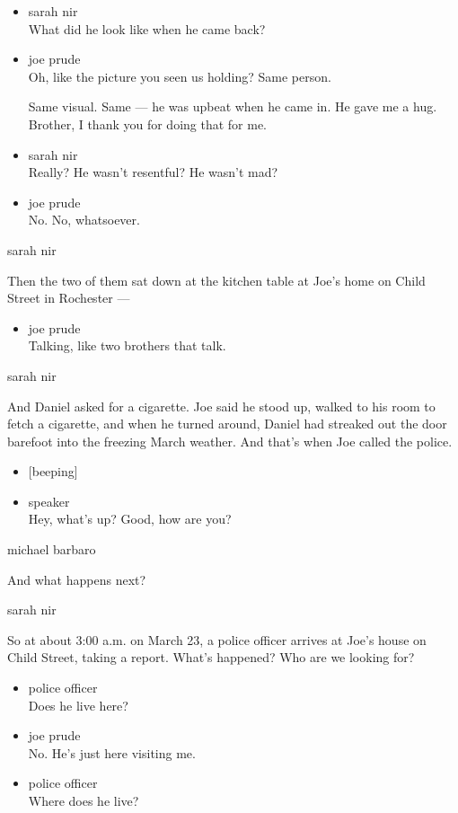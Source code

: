 \begin{itemize}
\item
  sarah nir\\
  What did he look like when he came back?
\item
  joe prude\\
  Oh, like the picture you seen us holding? Same person.

  Same visual. Same --- he was upbeat when he came in. He gave me a hug.
  Brother, I thank you for doing that for me.
\item
  sarah nir\\
  Really? He wasn't resentful? He wasn't mad?
\item
  joe prude\\
  No. No, whatsoever.
\end{itemize}

sarah nir

Then the two of them sat down at the kitchen table at Joe's home on
Child Street in Rochester ---

\begin{itemize}
\tightlist
\item
  joe prude\\
  Talking, like two brothers that talk.
\end{itemize}

sarah nir

And Daniel asked for a cigarette. Joe said he stood up, walked to his
room to fetch a cigarette, and when he turned around, Daniel had
streaked out the door barefoot into the freezing March weather. And
that's when Joe called the police.

\begin{itemize}
\item
  {[}beeping{]}
\item
  speaker\\
  Hey, what's up? Good, how are you?
\end{itemize}

michael barbaro

And what happens next?

sarah nir

So at about 3:00 a.m. on March 23, a police officer arrives at Joe's
house on Child Street, taking a report. What's happened? Who are we
looking for?

\begin{itemize}
\item
  police officer\\
  Does he live here?
\item
  joe prude\\
  No. He's just here visiting me.
\item
  police officer\\
  Where does he live?
\end{itemize}

